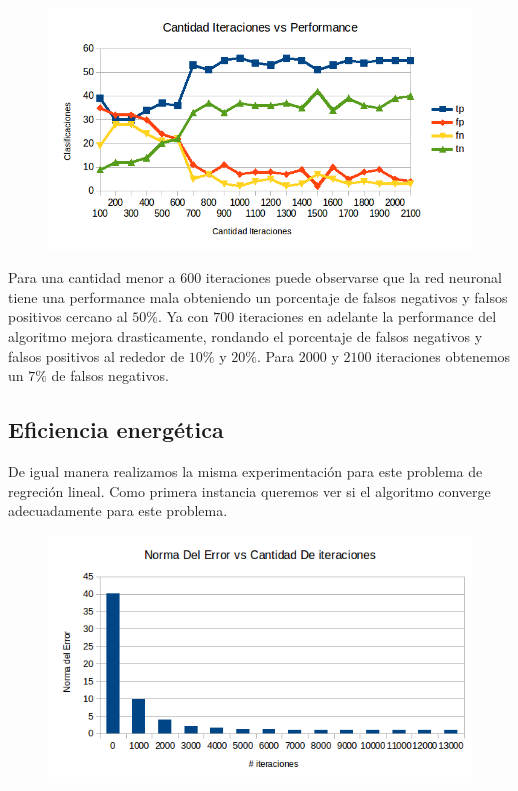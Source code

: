 \begin{figure}[h!]
  \centering
    \includegraphics[scale=0.4]{ej1_test_iter/1.png}
\end{figure}

Para una cantidad menor a $600$ iteraciones puede observarse que la red neuronal tiene una performance mala obteniendo un porcentaje de falsos negativos y falsos positivos cercano al $50\%$. Ya con $700$ iteraciones en adelante la performance del algoritmo mejora drasticamente, rondando el porcentaje de falsos negativos y falsos positivos al rededor de $10 \%$ y $20\%$. Para $2000$ y $2100$ iteraciones obtenemos un $7\%$  de falsos negativos.


\subsection{Eficiencia energética} 


De igual manera realizamos la misma experimentación para este problema de regreción lineal. Como primera instancia queremos ver si el algoritmo converge adecuadamente para este problema.

\begin{figure}[h!]
  \centering
    \includegraphics[scale=0.4]{ej1_convergencia/1.png}
\end{figure}